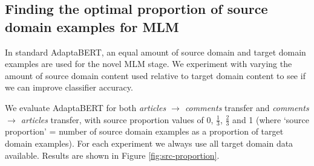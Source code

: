 \subsection{Finding the optimal proportion of source domain examples for MLM} \label{subsec:src-proportion-adaptabert}

In standard AdaptaBERT, an equal amount of source domain and target domain examples are used for the novel MLM stage. We experiment with varying the amount of source domain content used relative to target domain content to see if we can improve classifier accuracy.

We evaluate AdaptaBERT for both \textit{articles $ \rightarrow $ comments} transfer and \textit{comments $ \rightarrow $ articles} transfer, with source proportion values of 0, $ \frac{1}{3} $, $ \frac{2}{3} $ and 1 (where `source proportion' = number of source domain examples as a proportion of target domain examples). For each experiment we always use all target domain data available. Results are shown in Figure \ref{fig:src-proportion}.

